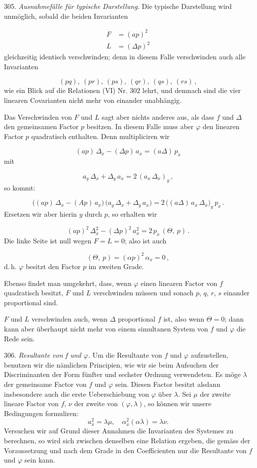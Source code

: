 \documentclass[11pt]{article}
\providecommand{\weberpage}[1]{}
\providecommand{\weq}[2]{\begin{equation}\tag{#1}#2\end{equation}}
\let\Delta\varDelta
\let\Theta\varTheta
\begin{document}
305. \textit{Ausnahmefälle für typische Darstellung.} Die typische
Darstellung wird unmöglich, sobald die beiden Invarianten

\[
\begin{aligned}
F &= (ap)^2\\
L &= (\Delta p)^2
\end{aligned}
\]
gleichzeitig identisch verschwinden; denn in diesem Falle verschwinden
auch alle Invarianten

\[
(pq),\ (pr),\ (ps),\ (qr),\ (qs),\ (rs)\,,
\]
wie ein Blick auf die Relationen (VI) Nr. 302 lehrt, und demnach sind die
vier linearen Covarianten nicht mehr von einander unabhängig.

Das Verschwinden von $F$ und $L$ sagt aber nichts anderes aus, als dass
$f$ und $\Delta$ den gemeinsamen Factor $p$ besitzen. In diesem Falle muss
aber $\varphi$ den linearen Factor $p$ quadratisch enthalten. Denn
multipliciren wir

\weq{1}{(ap)\,\Delta_x - (\Delta p)\,a_x = (a\Delta)\,p_x}
mit

\weq{2}{a_y\,\Delta_x + \Delta_y\,a_x = 2\,(a_x\,\Delta_x)_y\,,}
so kommt:

\[
\bigl((ap)\,\Delta_x - (Ap)\,a_x\bigr)\,\bigl(a_y\,\Delta_x + \Delta_y\,a_x\bigr) = 2\,\bigl((a\Delta)\,a_x\,\Delta_x\bigr)_y\,p_x\,. %
\]
Ersetzen wir aber hierin $y$ durch $p$, so erhalten wir

\[
(ap)^2\,\Delta_x^2 - (\Delta p)^2\,a_x^2 = 2\,p_x\,(\Theta,\ p)\,.
\]
Die linke Seite ist null wegen $F = L = 0$; also ist auch

\[
(\Theta,\ p) = (\alpha p)^2\,\alpha_x = 0\,,
\]
d.\,h. $\varphi$ besitzt den Factor $p$ im zweiten Grade.

Ebenso findet man umgekehrt, dass, wenn $\varphi$ einen linearen Factor
von $f$ quadratisch besitzt, $F$ und $L$ verschwinden müssen und sonach
$p$, $q$, $r$, $s$ einander proportional sind.


\weberpage{329}

$F$ und $L$ verschwinden auch, wenn $\Delta$ proportional $f$ ist, also
wenn $\Theta = 0$; dann kann aber überhaupt nicht mehr von einem simultanen
System von $f$ und $\varphi$ die Rede sein.

306. \textit{Resultante von f und $\varphi$.} Um die Resultante von $f$ und
$\varphi$ aufzustellen, benutzen wir die nämlichen Principien, wie wir sie
beim Aufsuchen der Discriminanten der Form fünfter und sechster Ordnung
verwendeten. Es möge $\lambda$ der gemeinsame Factor von $f$ und $\varphi$
sein. Diesen Factor besitzt alsdann insbesondere auch die erste
Ueberschiebung von $\varphi$ über $\lambda$. Sei $\mu$ der zweite lineare
Factor von $f$, $\nu$ der zweite von $(\varphi, \lambda)$, so können wir
unsere Bedingungen formuliren:
\[
a_x^2 = \lambda\mu, \quad \alpha_x^2(\alpha\lambda) = \lambda\nu.
\]
Versuchen wir auf Grund dieser Annahmen die Invarianten des Systemes zu
berechnen, so wird sich zwischen denselben eine Relation ergeben, die
gemäss der Voraussetzung und nach dem Grade in den Coefficienten nur die
Resultante von $f$ und $\varphi$ sein kann.
\end{document}
